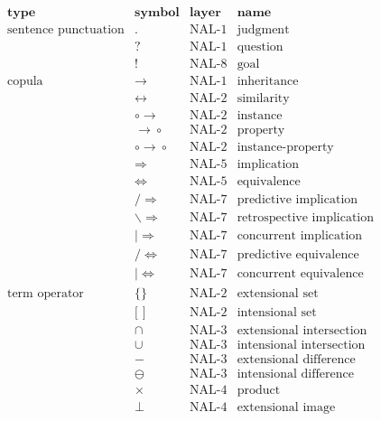 \begin{table}[hbt]
\small
\centering
\[\begin{array}{|r|c|c|l|} \hline
\textbf{type} 	& \textbf{symbol} 	& \textbf{layer}		& \textbf{name} \\
\hline
\mbox{sentence punctuation} 
& .    & \mbox{NAL-1} & \mbox{judgment} \\
& ?    & \mbox{NAL-1} & \mbox{question} \\
& !    & \mbox{NAL-8} & \mbox{goal} \\
\hline
\mbox{copula} 
& \rightarrow & \mbox{NAL-1} & \mbox{inheritance} \\
& \leftrightarrow & \mbox{NAL-2} & \mbox{similarity} \\
& \circ\!\!\rightarrow & \mbox{NAL-2} & \mbox{instance} \\
& \rightarrow\!\!\circ & \mbox{NAL-2} & \mbox{property} \\
& \circ\!\!\rightarrow\!\!\circ & \mbox{NAL-2} & \mbox{instance-property} \\
& \Rightarrow & \mbox{NAL-5} & \mbox{implication} \\
& \Leftrightarrow & \mbox{NAL-5} & \mbox{equivalence} \\
& /\!\!\!\Rightarrow & \mbox{NAL-7} & \mbox{predictive implication} \\
& \backslash\!\!\!\Rightarrow & \mbox{NAL-7} & \mbox{retrospective implication} \\
& |\!\!\!\Rightarrow & \mbox{NAL-7} & \mbox{concurrent implication} \\
& /\!\!\!\Leftrightarrow & \mbox{NAL-7} & \mbox{predictive equivalence} \\
& |\!\!\!\Leftrightarrow & \mbox{NAL-7} & \mbox{concurrent equivalence} \\
\hline
\mbox{term operator} 
& \{  \} & \mbox{NAL-2} & \mbox{extensional set} \\
& \mbox{[ ]}  & \mbox{NAL-2} & \mbox{intensional set} \\
& \cap & \mbox{NAL-3} & \mbox{extensional intersection} \\ 
& \cup & \mbox{NAL-3} & \mbox{intensional intersection} \\ 
& - & \mbox{NAL-3} & \mbox{extensional difference} \\ 
& \ominus & \mbox{NAL-3} & \mbox{intensional difference} \\ 
& \times & \mbox{NAL-4} & \mbox{product} \\
& \bot & \mbox{NAL-4} & \mbox{extensional image} \\ 

\end{array}\]
\end{table}
